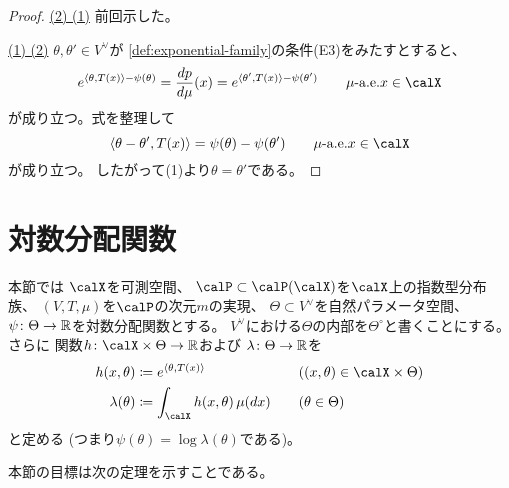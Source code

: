 \documentclass[report]{jlreq}
\begin{document}
\begin{proof}
    \uline{(2) \Rightarrow (1)} \quad
    前回示した。

    \uline{(1) \Rightarrow (2)} \quad
    $\theta, \theta' \in V^\vee$が
    \cref{def:exponential-family}の条件(E3)をみたすとすると、
    \begin{equation}
        e^{\langle \theta, T(x) \rangle - \psi(\theta)}
            = \dd[p]{\mu}(x)
            = e^{\langle \theta', T(x) \rangle - \psi(\theta')}
            \qquad
            \text{$\mu$-a.e.$x \in \calX$}
    \end{equation}
    が成り立つ。式を整理して
    \begin{equation}
        \langle \theta - \theta', T(x) \rangle
            = \psi(\theta) - \psi(\theta')
            \qquad
            \text{$\mu$-a.e.$x \in \calX$}
    \end{equation}
    が成り立つ。
    したがって(1)より$\theta = \theta'$である。
\end{proof}

%
\section{対数分配関数}


本節では
$\calX$を可測空間、
$\calP \subset \calP(\calX)$を$\calX$上の指数型分布族、
$(V, T, \mu)$を$\calP$の次元$m$の実現、
$\Theta \subset V^\vee$を自然パラメータ空間、
$\psi \colon \Theta \to \mathbb{R}$を対数分配関数とする。
$V^\vee$における$\Theta$の内部を$\Theta^\circ$と書くことにする。
さらに
関数$h \colon \calX \times \Theta \to \R$および
$\lambda \colon \Theta \to \mathbb{R}$を
\begin{alignat}{2}
    h(x, \theta)
        &\coloneqq e^{\langle \theta, T(x) \rangle}
        &&\quad ((x, \theta) \in \calX \times \Theta) \\
    \lambda(\theta)
        &\coloneqq \int_\calX h(x, \theta) \, \mu(dx)
        &&\quad (\theta \in \Theta)
\end{alignat}
と定める (つまり$\psi(\theta) = \log \lambda(\theta)$である)。

本節の目標は次の定理を示すことである。
\end{document}
